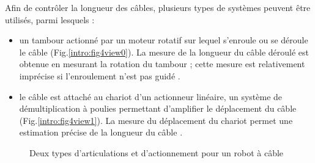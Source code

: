 Afin de contrôler la longueur des câbles, plusieurs types de systèmes peuvent 
être utilisés, parmi lesquels :
\begin{itemize}
 \item un tambour actionné par un moteur rotatif sur lequel s'enroule ou se 
déroule le câble (Fig.\ref{intro:fig4view0}). La mesure de la longueur du câble 
déroulé est obtenue en mesurant la rotation du tambour ; cette mesure est 
relativement imprécise si l'enroulement n'est pas guidé \cite{merlet2008}.
 \item le câble est attaché au chariot d'un actionneur linéaire, un système de 
démultiplication à poulies permettant d'amplifier le déplacement du câble 
(Fig.\ref{intro:fig4view1}). La mesure du déplacement du chariot permet une 
estimation précise de la longueur du câble \cite{merlet2008}. 
\end{itemize}

\begin{figure}[!ht]
  \centering
\hfill
    \caption{\footnotesize Deux types d'articulations et d'actionnement pour un 
robot à câble}
\label{intro:fig4}
\end{figure}

